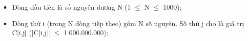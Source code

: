 \begin{itemize}
	\item     Dòng đầu tiên là số nguyên dương N (1  $\le$  N  $\le$  1000);   
	\item     Dòng thứ i (trong N dòng tiếp theo) gồm N số nguyên. Số thứ j cho là giá trị C[i,j] (|C[i,j]|  $\le$  1.000.000.000);   
\end{itemize}

\